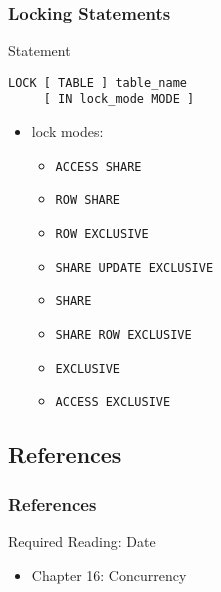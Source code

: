 \documentclass[dvipsnames]{beamer}
\theoremstyle{plain}
\begin{document}
\begin{frame}[fragile]
  \frametitle{Locking Statements}

  \begin{block}{Statement}
    \begin{lstlisting}
LOCK [ TABLE ] table_name
     [ IN lock_mode MODE ]
    \end{lstlisting}

    \pause
    \begin{itemize}
      \item lock modes:
      \begin{itemize}
        \item \lstinline!ACCESS SHARE!
        \item \lstinline!ROW SHARE!
        \item \lstinline!ROW EXCLUSIVE!
        \item \lstinline!SHARE UPDATE EXCLUSIVE!
        \item \lstinline!SHARE!
        \item \lstinline!SHARE ROW EXCLUSIVE!
        \item \lstinline!EXCLUSIVE!
        \item \lstinline!ACCESS EXCLUSIVE!
      \end{itemize}
    \end{itemize}

  \end{block}
\end{frame}

\subsection*{References}

\begin{frame}
  \frametitle{References}

  \begin{block}{Required Reading: Date}
    \begin{itemize}
      \item Chapter 16: \alert{Concurrency}
    \end{itemize}
  \end{block}
\end{frame}
\end{document}
